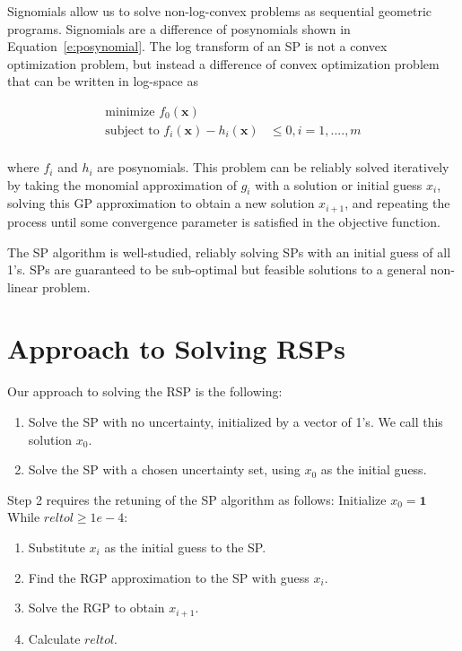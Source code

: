 \documentclass{article}
\renewcommand{\vec}{\mathbf}
\begin{document}
Signomials allow us to solve non-log-convex problems as sequential geometric programs. Signomials are a difference of posynomials shown in Equation~\ref{e:posynomial}. The log transform of an SP is not a convex optimization problem, but instead a difference of convex optimization problem that can be written in log-space as

\begin{equation}
\begin{aligned}
\text{minimize }f_{0}(\mathbf{x})& \\
\text{subject to }f_{i}(\mathbf{x}) -  h_{i}(\mathbf{x})& \leq 0, i = 1, ...., m \\
\end{aligned}
\end{equation}

where $f_{i}$ and $h_{i}$ are posynomials. This problem can be reliably solved iteratively by taking the monomial approximation of $g_{i}$ with a solution or initial guess $x_{i}$, solving this GP approximation to obtain a new solution $x_{i+1}$, and repeating the process until some convergence parameter is satisfied in the objective function.

The SP algorithm is well-studied, reliably solving SPs with an initial guess of all 1’s. SPs are guaranteed to be sub-optimal but feasible solutions to a general non-linear problem. 


\section{Approach to Solving RSPs}

Our approach to solving the RSP is the following: 

\begin{enumerate}
    \item Solve the SP with no uncertainty, initialized by a vector of 1's. We call this solution $x_0$.
    \item Solve the SP with a chosen uncertainty set, using $x_0$ as the initial guess. 
\end{enumerate}

Step 2 requires the retuning of the SP algorithm as follows:
\newline
\newline
Initialize $x_0 = \vec{1}$ \newline
 While $reltol \geq 1e-4$:
    \begin{enumerate}
        \item Substitute $x_i$ as the initial guess to the SP. 
        \item Find the RGP approximation to the SP with guess $x_i$.
        \item Solve the RGP to obtain $x_{i+1}$. 
        \item Calculate $reltol$.
    \end{enumerate}
\end{document}
